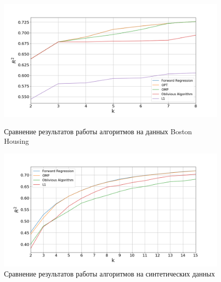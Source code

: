 \documentclass[preprint,12pt]{elsarticle}
\begin{document}
\begin{figure}[H]
    \begin{minipage}{.49\textwidth}
        \centering
        \includegraphics[width=1.1\linewidth]{img/boston_housing.png}
        \caption{Сравнение результатов работы алгоритмов на данных Boston Housing}
    \end{minipage}
    \begin{minipage}{.49\textwidth}
        \centering
        \includegraphics[width=1.1\linewidth]{img/sythetic_data.png}
        \caption{Сравнение результатов работы алгоритмов на синтетических данных}
    \end{minipage}
\end{figure}
\end{document}
